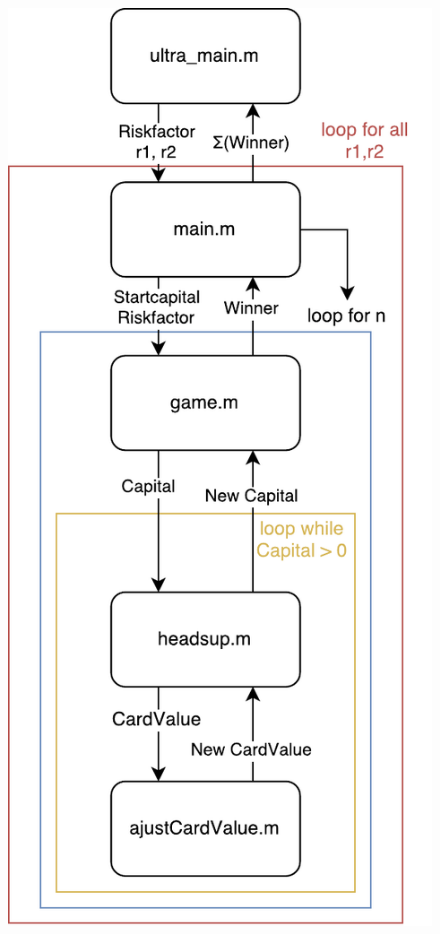 \documentclass[11pt]{article}
\begin{document}
\begin{figure}[htbp]
\begin{minipage}{0.48\textwidth}
	\includegraphics[width=\textwidth]{Graphics/diagram_senkrecht.pdf}

\end{minipage}
\end{figure}
\end{document}
